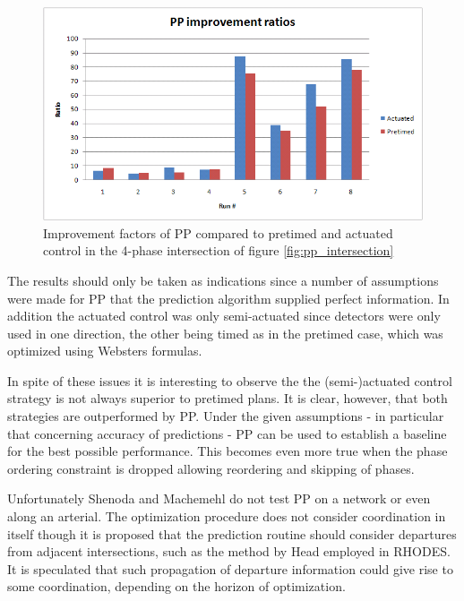 \begin{figure}[!ht]
\begin{center}
\includegraphics[scale=0.5]{phase-by-phase_improvement_ratios.png} 
\end{center}
\caption{Improvement factors of PP compared to pretimed and actuated control in the 4-phase intersection of figure \ref{fig:pp_intersection}}
\label{fig:pp_improvements}
\end{figure}

The results should only be taken as indications since a number of assumptions were made for PP that the prediction algorithm supplied perfect information. In addition the actuated control was only semi-actuated since detectors were only used in one direction, the other being timed as in the pretimed case, which was optimized using Websters formulas.

In spite of these issues it is interesting to observe the the (semi-)actuated control strategy is not always superior to pretimed plans. It is clear, however, that both strategies are outperformed by PP. Under the given assumptions - in particular that concerning accuracy of predictions - PP can be used to establish a baseline for the best possible performance. This becomes even more true when the phase ordering constraint is dropped allowing reordering and skipping of phases.

Unfortunately Shenoda and Machemehl do not test PP on a network or even along an arterial. The optimization procedure does not consider coordination in itself though it is proposed that the prediction routine should consider departures from adjacent intersections, such as the method by Head employed in RHODES. It is speculated that such propagation of departure information could give rise to some coordination, depending on the horizon of optimization.
